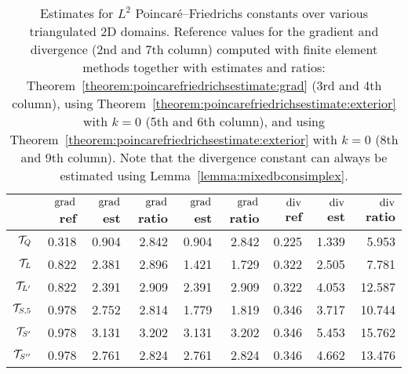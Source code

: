 \documentclass[10pt,a4paper]{article}
\begin{document}
\begin{table}[t]
    \centering
    \begin{tabular}{|r||r|r|r|r|r||r|r|r|}
        \hline
                        & $\operatorname{grad}$ ref  & $\operatorname{grad}$ est & $\operatorname{grad}$ ratio       & $\operatorname{grad}$ est   & $\operatorname{grad}$ ratio      & $\operatorname{div}$ ref  & $\operatorname{div}$ est  & $\operatorname{div}$ ratio \\ 
        \hline
        ${\mathcal T}_{Q}$     & 0.318        & 0.904       & 2.842               & 0.904         & 2.842              & 0.225              & 1.339              &  5.953         \\
        \hline
        ${\mathcal T}_{L}$     & 0.822        & 2.381       & 2.896               & 1.421         & 1.729              & 0.322              & 2.505              &  7.781         \\
        \hline
        ${\mathcal T}_{L'}$    & 0.822        & 2.391       & 2.909               & 2.391         & 2.909              & 0.322              & 4.053              & 12.587         \\
        \hline
        ${\mathcal T}_{S,5}$   & 0.978        & 2.752       & 2.814               & 1.779         & 1.819              & 0.346              & 3.717              & 10.744         \\ 
        \hline %
        ${\mathcal T}_{S'}$    & 0.978        & 3.131       & 3.202               & 3.131         & 3.202              & 0.346              & 5.453              & 15.762         \\
        \hline %
        ${\mathcal T}_{S''}$   & 0.978        & 2.761       & 2.824               & 2.761         & 2.824              & 0.346              & 4.662              & 13.476         \\
        \hline
    \end{tabular}
    \caption{
    Estimates for $L^2$ Poincar\'e--Friedrichs constants over various triangulated 2D domains.
    Reference values for the gradient and divergence (2nd and 7th column) computed with finite element methods together with estimates and ratios: 
    Theorem~\ref{theorem:poincarefriedrichsestimate:grad} (3rd and 4th column), using Theorem~\ref{theorem:poincarefriedrichsestimate:exterior} with $k=0$ (5th and 6th column), 
    and using Theorem~\ref{theorem:poincarefriedrichsestimate:exterior} with $k=0$ (8th and 9th column).
    Note that the divergence constant can always be estimated using Lemma~\ref{lemma:mixedbconsimplex}.
    }\label{table:estimates2D}
\end{table}
\end{document}
